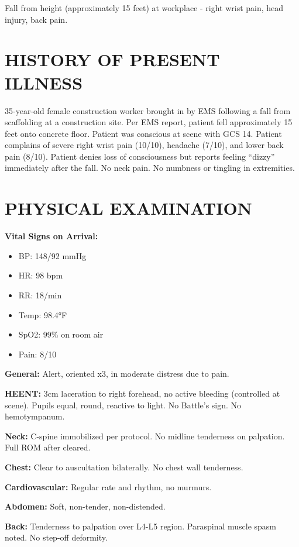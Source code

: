 \documentclass[11pt]{article}
\begin{document}
Fall from height (approximately 15 feet) at workplace - right wrist pain, head injury, back pain.

\section*{HISTORY OF PRESENT ILLNESS}

35-year-old female construction worker brought in by EMS following a fall from scaffolding at a construction site. Per EMS report, patient fell approximately 15 feet onto concrete floor. Patient was conscious at scene with GCS 14. Patient complains of severe right wrist pain (10/10), headache (7/10), and lower back pain (8/10). Patient denies loss of consciousness but reports feeling ``dizzy'' immediately after the fall. No neck pain. No numbness or tingling in extremities.

\section*{PHYSICAL EXAMINATION}

\textbf{Vital Signs on Arrival:}
\begin{itemize}[nosep]
\item BP: 148/92 mmHg
\item HR: 98 bpm
\item RR: 18/min
\item Temp: 98.4°F
\item SpO2: 99\% on room air
\item Pain: 8/10
\end{itemize}

\textbf{General:} Alert, oriented x3, in moderate distress due to pain.

\textbf{HEENT:} 3cm laceration to right forehead, no active bleeding (controlled at scene). Pupils equal, round, reactive to light. No Battle's sign. No hemotympanum.

\textbf{Neck:} C-spine immobilized per protocol. No midline tenderness on palpation. Full ROM after cleared.

\textbf{Chest:} Clear to auscultation bilaterally. No chest wall tenderness.

\textbf{Cardiovascular:} Regular rate and rhythm, no murmurs.

\textbf{Abdomen:} Soft, non-tender, non-distended.

\textbf{Back:} Tenderness to palpation over L4-L5 region. Paraspinal muscle spasm noted. No step-off deformity.
\end{document}
